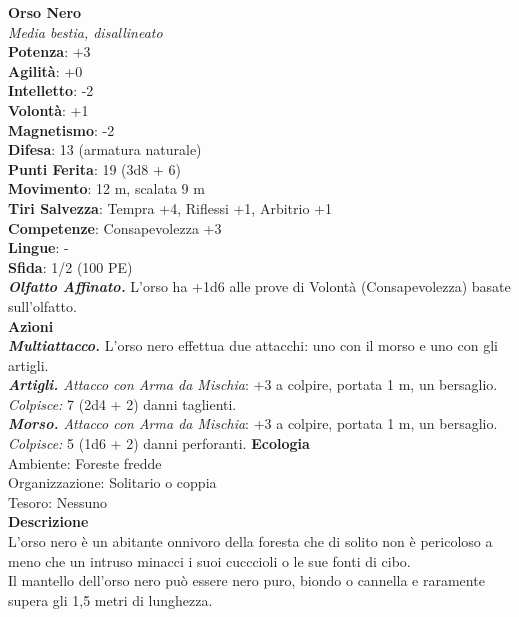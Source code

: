 \begin{multicols}{2}
\medskip\textbf{Orso Nero}\\
\emph{Media bestia, disallineato}\\
\textbf{Potenza}: +3\\
\textbf{Agilità}: +0\\
\textbf{Intelletto}: -2\\
\textbf{Volontà}: +1\\
\textbf{Magnetismo}: -2\\
\textbf{Difesa}: 13 (armatura naturale)\\
\textbf{Punti Ferita}: 19 (3d8 + 6)\\
\textbf{Movimento}: 12 m, scalata 9 m\\
\textbf{Tiri Salvezza}: Tempra +4, Riflessi +1, Arbitrio +1 \\
\textbf{Competenze}: Consapevolezza +3\\
\textbf{Lingue}: -\\
\textbf{Sfida}: 1/2 (100 PE)\smallskip\\
\emph{\textbf{Olfatto Affinato.}} L'orso ha +1d6 alle prove di Volontà (Consapevolezza) basate sull'olfatto.\\
\smallskip\textbf{Azioni}\\
\emph{\textbf{Multiattacco.}} L'orso nero effettua due attacchi: uno con il morso e uno con gli artigli.\\
\emph{\textbf{Artigli.} Attacco con Arma da Mischia}: +3 a colpire, portata 1 m, un bersaglio.\\
\emph{Colpisce:} 7 (2d4 + 2) danni taglienti.\\
\emph{\textbf{Morso.} Attacco con Arma da Mischia}: +3 a colpire, portata 1 m, un bersaglio.\\
\emph{Colpisce:} 5 (1d6 + 2) danni perforanti.
\textbf{Ecologia}\\
Ambiente: Foreste fredde\\
Organizzazione: Solitario o coppia\\
Tesoro: Nessuno\\
\textbf{Descrizione}\\
L'orso nero è un abitante onnivoro della foresta che di solito non è pericoloso a meno che un intruso minacci i suoi cucccioli o le sue fonti di cibo.\\
Il mantello dell'orso nero può essere nero puro, biondo o cannella e raramente supera gli 1,5 metri di lunghezza. \\



\end{multicols}
